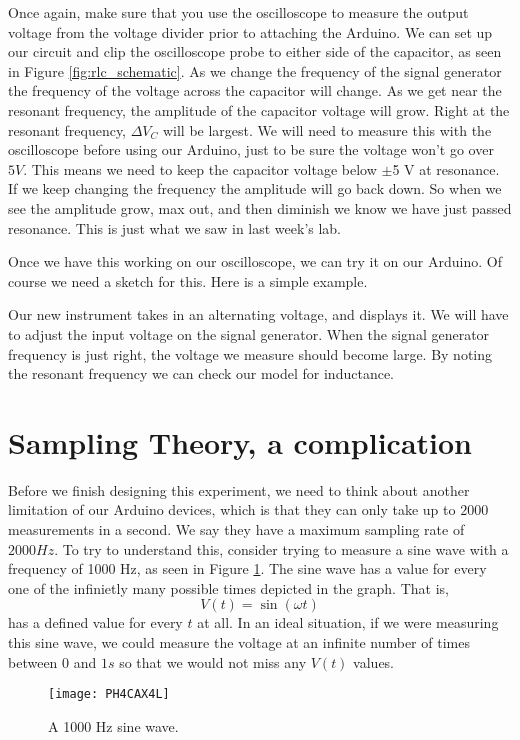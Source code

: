 Once again, make sure that you use the oscilloscope to measure the output
voltage from the voltage divider prior to attaching the Arduino.
We can set up our circuit and clip the oscilloscope probe to either side of
the capacitor, as seen in Figure \ref{fig:rlc_schematic}. 
As we change the frequency of the signal generator the
frequency of the voltage across the capacitor will change. As we get near
the resonant frequency, the amplitude of the capacitor voltage will grow.
Right at the resonant frequency, $\Delta V_{C}$ will be largest. We will
need to measure this with the oscilloscope 
before using our Arduino, just to be sure the voltage won't
go over $5\unit{V}$. This means we need to keep the capacitor voltage
below $\pm$5 V at resonance.
If we keep changing the frequency the amplitude will go back
down. So when we see the amplitude grow, max out, and then diminish we know
we have just passed resonance. This is just what we saw in last week's lab.

Once we have this working on our oscilloscope, we can try it on our Arduino.
Of course we need a sketch for this. Here is a simple example.


Our new instrument takes in an alternating voltage, and displays it. We
will have to adjust the input voltage on the signal generator. When the
signal generator frequency is just right, the voltage we measure should
become large. By noting the resonant frequency we can check our model for
inductance.

\section{Sampling Theory, a complication}

Before we finish designing this experiment, we need to think about another
limitation of our Arduino devices, which is that they can only take up to $%
2000$ measurements in a second. We say they have a maximum sampling rate of $%
2000\unit{Hz}.$ To try to understand this, consider trying to measure a sine
wave with a frequency of 1000 Hz, as seen in Figure \ref{fig:sine}.
The sine wave has a value for every one of the infinietly many possible times
depicted in the graph. That is, 
\begin{equation*}
V\left( t\right) =\sin \left( \omega t\right)
\end{equation*}%
has a defined value for every $t$ at all. In an ideal situation, if we were 
measuring this sine wave, we could measure the voltage at an infinite 
number of times between 
$0$ and $1\unit{s}$ so that we would not miss any $V\left(
t\right) $ values. 
\begin{figure}[htbp!]
	\centering
\texttt{[image: PH4CAX4L]}
	\caption{A 1000 Hz sine wave.}
	\label{fig:sine}
\end{figure}

